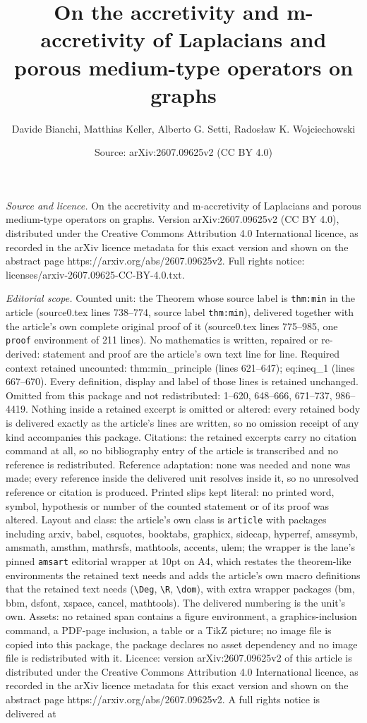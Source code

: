 \documentclass[10pt,a4paper]{amsart}
\title[On the accretivity and m-accretivity of Laplacians and porou]{On the accretivity and m-accretivity of Laplacians and porous medium-type operators on graphs}
\author{Davide Bianchi, Matthias Keller, Alberto G. Setti, Rados{\l}aw K. Wojciechowski}
\date{Source: arXiv:2607.09625v2 (CC BY 4.0)}
\begin{document}
\maketitle

\noindent\emph{Source and licence.} On the accretivity and m-accretivity of Laplacians and porous medium-type operators on graphs. Version arXiv:2607.09625v2 (CC BY 4.0), distributed under the Creative Commons Attribution 4.0 International licence, as recorded in the arXiv licence metadata for this exact version and shown on the abstract page https://arxiv.org/abs/2607.09625v2. Full rights notice: licenses/arxiv-2607.09625-CC-BY-4.0.txt.\par\smallskip

\noindent\textit{Editorial scope.} Counted unit: the Theorem whose source label is \texttt{thm:min} in the article (source0.tex lines 738--774, source label \texttt{thm:min}), delivered together with the article's own complete original proof of it (source0.tex lines 775--985, one \texttt{proof} environment of 211 lines). No mathematics is written, repaired or re-derived: statement and proof are the article's own text line for line. Required context retained uncounted: thm:min\_principle (lines 621--647); eq:ineq\_1 (lines 667--670). Every definition, display and label of those lines is retained unchanged. Omitted from this package and not redistributed: 1--620, 648--666, 671--737, 986--4419. Nothing inside a retained excerpt is omitted or altered: every retained body is delivered exactly as the article's lines are written, so no omission receipt of any kind accompanies this package. Citations: the retained excerpts carry no citation command at all, so no bibliography entry of the article is transcribed and no reference is redistributed. Reference adaptation: none was needed and none was made; every reference inside the delivered unit resolves inside it, so no unresolved reference or citation is produced. Printed slips kept literal: no printed word, symbol, hypothesis or number of the counted statement or of its proof was altered. Layout and class: the article's own class is \texttt{article} with packages including arxiv, babel, csquotes, booktabs, graphicx, sidecap, hyperref, amssymb, amsmath, amsthm, mathrsfs, mathtools, accents, ulem; the wrapper is the lane's pinned \texttt{amsart} editorial wrapper at 10pt on A4, which restates the theorem-like environments the retained text needs and adds the article's own macro definitions that the retained text needs (\texttt{\textbackslash Deg}, \texttt{\textbackslash R}, \texttt{\textbackslash dom}), with extra wrapper packages (bm, bbm, dsfont, xspace, cancel, mathtools). The delivered numbering is the unit's own. Assets: no retained span contains a figure environment, a graphics-inclusion command, a PDF-page inclusion, a table or a TikZ picture; no image file is copied into this package, the package declares no asset dependency and no image file is redistributed with it. Licence: version arXiv:2607.09625v2 of this article is distributed under the Creative Commons Attribution 4.0 International licence, as recorded in the arXiv licence metadata for this exact version and shown on the abstract page https://arxiv.org/abs/2607.09625v2. A full rights notice is delivered at 
\end{document}
